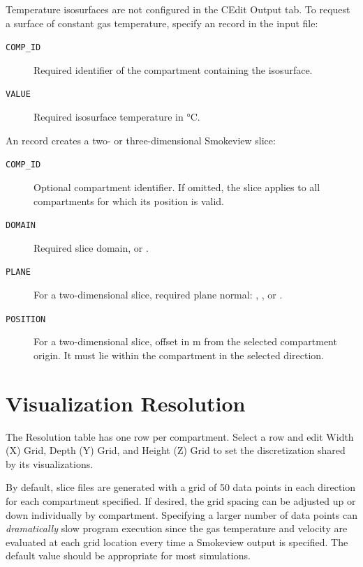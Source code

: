 {{Temperature isosurfaces are not configured in the CEdit Output tab. To request a surface of constant gas temperature, specify an  record in the input file:
\begin{description}
\item[\texttt{COMP\_ID}] Required identifier of the compartment containing the isosurface.
\item[\texttt{VALUE}] Required isosurface temperature in \unit{\degreeCelsius}.
\end{description}

An  record creates a two- or three-dimensional Smokeview slice:
\begin{description}
\item[\texttt{COMP\_ID}] Optional compartment identifier. If omitted, the slice applies to all compartments for which its position is valid.
\item[\texttt{DOMAIN}] Required slice domain,  or .
\item[\texttt{PLANE}] For a two-dimensional slice, required plane normal: , , or .
\item[\texttt{POSITION}] For a two-dimensional slice, offset in m from the selected compartment origin. It must lie within the compartment in the selected direction.
\end{description}


\section{Visualization Resolution}
\label{info:SLCF2}

The Resolution table has one row per compartment. Select a row and edit Width (X) Grid, Depth (Y) Grid, and Height (Z) Grid to set the discretization shared by its visualizations.

By default, slice files are generated with a grid of 50 data points in each direction for each compartment specified. If desired, the grid spacing can be adjusted up or down individually by compartment. Specifying a larger number of data points can \textit{dramatically} slow program execution since the gas temperature and velocity are evaluated at each grid location every time a Smokeview output is specified.  The default value should be appropriate for most simulations.

}}
